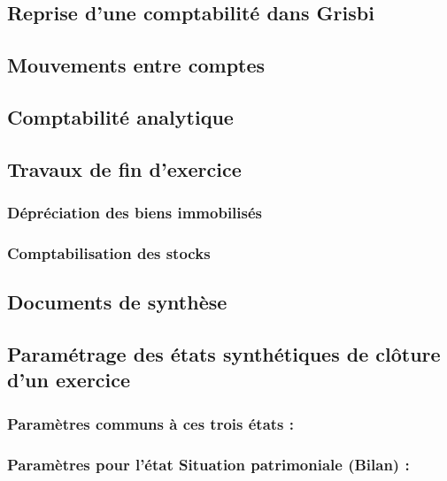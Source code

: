 \subsection{Reprise d'une comptabilité dans Grisbi\label{association-plan-opening}}
 

\subsection{Mouvements entre comptes\label{association-plan-activity}}


\subsection{Comptabilité analytique\label{association-plan-analytic}}


\subsection {Travaux de fin d’exercice} \label{association-plan-closingWork}

\subsubsection {Dépréciation des biens immobilisés} 

\subsubsection {Comptabilisation des stocks}


\subsection {Documents de synthèse} \label{association-plan-synthesis}


\subsection {Paramétrage des états synthétiques de clôture d'un exercice\label{association-plan-synthesis-parameters}}


\subsubsection {Paramètres communs à ces trois états :}

		
\subsubsection {Paramètres pour l'état Situation patrimoniale (Bilan) :}		
			
